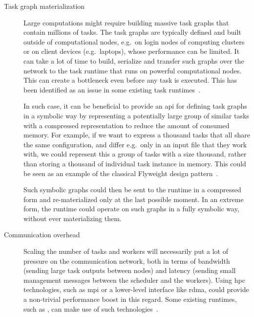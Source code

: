 \begin{description}
	\item[Task graph materialization] Large computations might require building massive task graphs that contain millions of tasks. The
		task graphs are typically defined and built outside of computational nodes, e.g.\ on login nodes of
		computing clusters or on client devices (e.g.\ laptops), whose performance can be limited. It can
		take a lot of time to build, serialize and transfer such graphs over the network to the task
		runtime that runs on powerful computational nodes. This can create a bottleneck even before any
		task is executed. This has been identified as an issue in some existing task
		runtimes~\cite{dask-client-perf}.

		In such case, it can be beneficial to provide an \gls{api} for defining task
		graphs in a symbolic way by representing a potentially large group of similar tasks with a
		compressed representation to reduce the amount of consumed memory. For example, if we want to
		express a thousand tasks that all share the same configuration, and differ e.g.\ only in an input
		file that they work with, we could represent this a group of tasks with a size thousand, rather
		than storing a thousand of individual task instance in memory. This could be seen as an example of
		the classical Flyweight design pattern~\cite{gof}.

		Such symbolic graphs could then be sent to the runtime in a compressed form and re-materialized
		only at the last possible moment. In an extreme form, the runtime could operate on such graphs in a
		fully symbolic way, without ever materializing them.
	\item[Communication overhead] Scaling the number of tasks and workers will necessarily put a lot of pressure on the communication
		network, both in terms of bandwidth (sending large task outputs between nodes) and latency (sending
		small management messages between the scheduler and the workers). Using \gls{hpc}
		technologies, such as \gls{mpi} or a lower-level interface like
		\gls{rdma}, could provide a non-trivial performance boost in this regard. Some
		existing runtimes, such as \dask{}, can make use of such
		technologies~\cite{dask-ucx}.


\end{description}
